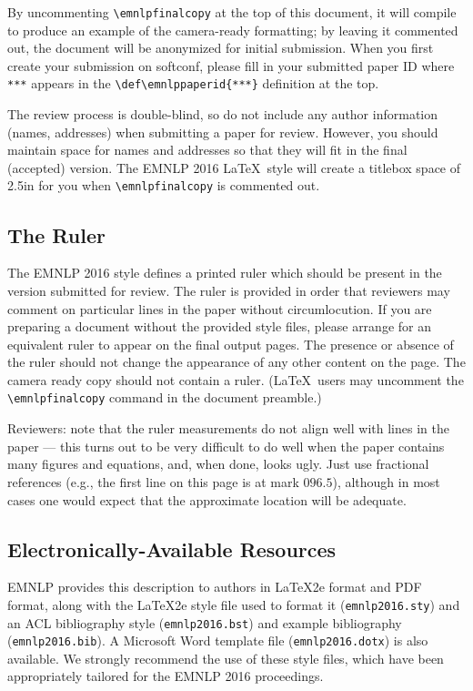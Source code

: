 \documentclass[11pt,letterpaper]{article}
\def\emnlppaperid{***}
\begin{document}
By uncommenting {\small\verb|\emnlpfinalcopy|} at the top of this document,
it will compile to produce an example of the camera-ready formatting; by
leaving it commented out, the document will be anonymized for initial
submission.  When you first create your submission on softconf, please fill
in your submitted paper ID where {\small\verb|***|} appears in the
{\small\verb|\def\emnlppaperid{***}|} definition at the top.

The review process is double-blind, so do not include any author information
(names, addresses) when submitting a paper for review. However, you should
maintain space for names and addresses so that they will fit in the final
(accepted) version.  The EMNLP 2016 \LaTeX\ style will create a titlebox
space of 2.5in for you when {\small\verb|\emnlpfinalcopy|} is commented out.

\subsection{The Ruler}
The EMNLP 2016 style defines a printed ruler which should be present in the
version submitted for review.  The ruler is provided in order that
reviewers may comment on particular lines in the paper without
circumlocution.  If you are preparing a document without the provided
style files, please arrange for an equivalent ruler to
appear on the final output pages.  The presence or absence of the ruler
should not change the appearance of any other content on the page.  The
camera ready copy should not contain a ruler. (\LaTeX\ users may uncomment
the {\small\verb|\emnlpfinalcopy|} command in the document preamble.)  

Reviewers:
note that the ruler measurements do not align well with lines in the paper
--- this turns out to be very difficult to do well when the paper contains
many figures and equations, and, when done, looks ugly.  Just use fractional
references (e.g., the first line on this page is at mark $096.5$), although
in most cases one would expect that the approximate location will be
adequate.

\subsection{Electronically-Available Resources}

EMNLP provides this description to authors in \LaTeX2e{} format
and PDF format, along with the \LaTeX2e{} style file used to format it
({\small\tt emnlp2016.sty}) and an ACL bibliography style
({\small\tt emnlp2016.bst}) and example bibliography
({\small\tt emnlp2016.bib}). A Microsoft Word template file
({\small\tt emnlp2016.dotx}) is also available. We strongly recommend the
use of these style files, which have been appropriately tailored for the
EMNLP 2016 proceedings.
\end{document}
